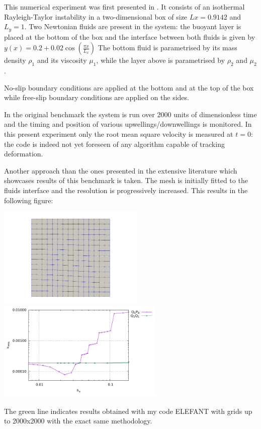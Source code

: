 
This numerical experiment was first presented in \cite{vaks97}.
It consists of an isothermal Rayleigh-Taylor instability in a two-dimensional box
of size $Lx=0.9142$ and $L_y=1$.
Two Newtonian fluids are present in the system: the buoyant layer is placed at the bottom of 
the box and the interface between both fluids is given by 
$
y(x)=0.2+0.02\cos \left( \frac{\pi x}{L_x}  \right)
$
The bottom fluid is parametrised by its mass density $\rho_1$ and its viscosity $\mu_1$, 
while the layer above is parametrised by $\rho_2$ and $\mu_2$.

No-slip boundary conditions are applied at the bottom and at the top of the box 
while free-slip boundary conditions are applied on the sides. 

In the original benchmark the system is run over 2000 units of dimensionless time and the 
timing and position of various upwellings/downwellings is monitored. 
In this present experiment only the root mean square velocity is measured at $t=0$:
the code is indeed not yet foreseen of any algorithm capable of tracking deformation.

Another approach than the ones presented in the extensive literature which showcases 
results of this benchmark is taken. The mesh is initially fitted to the fluids
interface and the resolution is progressively increased. This results in the 
following figure:

\begin{center}
\includegraphics[width=7cm]{python_codes/fieldstone_25/results/grid}
\includegraphics[width=8cm]{python_codes/fieldstone_25/results/vrms.pdf}
\end{center}
The green line indicates results obtained with my code ELEFANT with grids up to 2000x2000
with the exact same methodology.

